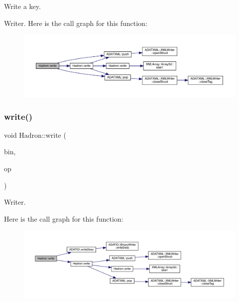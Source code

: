 Write a key. 

Writer. Here is the call graph for this function\+:\nopagebreak
\begin{figure}[H]
\begin{center}
\leavevmode
\includegraphics[width=350pt]{d1/daf/namespaceHadron_a64d17f6dc5e4987b14cc4a2d33401b7c_cgraph}
\end{center}
\end{figure}
\mbox{\label{namespaceHadron_a36eb0d304eb3644075b1598cde742d87}} 
\subsubsection{\texorpdfstring{write()}{write()}\hspace{0.1cm}{\footnotesize\ttfamily [95/95]}}
{\footnotesize\ttfamily void Hadron\+::write (\begin{DoxyParamCaption}\item[{\mbox{\hyperlink{classADATIO_1_1BinaryWriter}{Binary\+Writer}} \&}]{bin,  }\item[{const \mbox{\hyperlink{structHadron_1_1KeySingleHadronQuarkFlavorColor__t}{Key\+Single\+Hadron\+Quark\+Flavor\+Color\+\_\+t}} \&}]{op }\end{DoxyParamCaption})}



Writer. 

Here is the call graph for this function\+:\nopagebreak
\begin{figure}[H]
\begin{center}
\leavevmode
\includegraphics[width=350pt]{d1/daf/namespaceHadron_a36eb0d304eb3644075b1598cde742d87_cgraph}
\end{center}
\end{figure}


